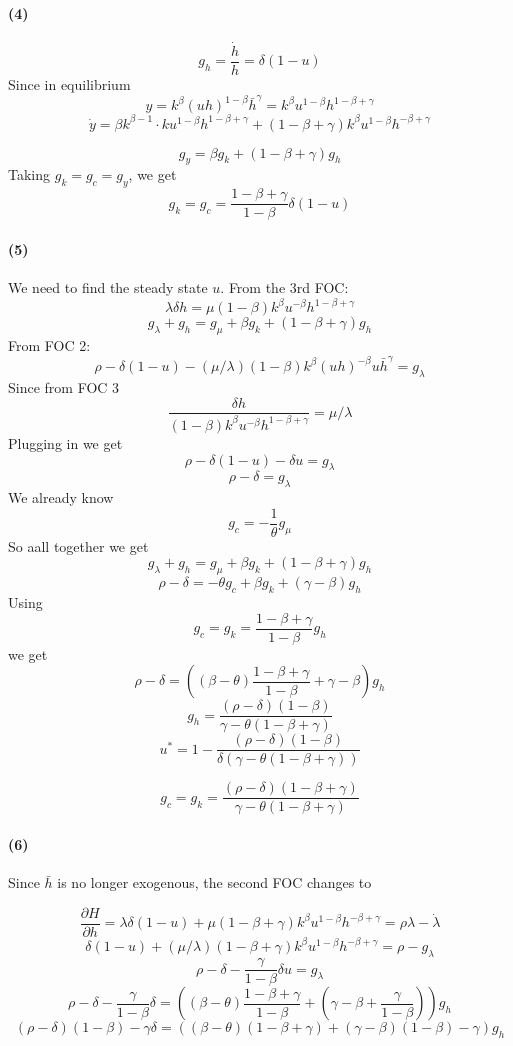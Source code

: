 \documentclass[10pt,letter]{article}
\newcommand{\problempart}[1]{\paragraph{#1}}
\begin{document}
\problempart{(4)}
\[ g_h = \frac{\dot{h}}{h} = \delta (1-u) \]
Since in equilibrium
\[ y = k^\beta (uh)^{1-\beta}\bar{h}^\gamma = k^\beta u^{1-\beta}h^{1-\beta + \gamma}\]
\[ \dot{y} = \beta k^{\beta - 1}\cdot{k} u^{1-\beta}h^{1-\beta + \gamma} + (1-\beta + \gamma )k^\beta u^{1-\beta}h^{-\beta + \gamma} \]

\[ g_y = \beta g_k  + (1-\beta + \gamma )g_h \]
Taking $g_k = g_c = g_y$, we get
\[ g_k = g_c = \frac{1-\beta + \gamma}{1-\beta}\delta (1-u) \]
\problempart{(5)}
We need to find the steady state $u$. From the 3rd FOC:
\[ \lambda \delta h = \mu (1-\beta)k^\beta u^{-\beta}h^{1 - \beta + \gamma}  \]
\[ g_\lambda + g_h = g_\mu + \beta g_k + (1-\beta+\gamma) g_h  \]
From FOC 2:
\[  \rho - \delta (1-u) - (\mu/\lambda) (1-\beta) k^\beta (uh)^{-\beta}u\bar{h}^\gamma = g_\lambda \]
Since from FOC 3
\[ \frac{\delta h}{(1-\beta)k^\beta u^{-\beta}h^{1 - \beta + \gamma}} = \mu/\lambda   \]
Plugging in we get
\[  \rho - \delta (1-u) - \delta u = g_\lambda \]
\[  \rho - \delta  = g_\lambda \]
We already know
\[ g_c = -\frac{1}{\theta} g_\mu \]
So aall together we get
\[ g_\lambda + g_h = g_\mu + \beta g_k + (1-\beta+\gamma) g_h  \]
\[ \rho - \delta   = - \theta g_c + \beta g_k + (\gamma - \beta) g_h  \]
Using
\[ g_c = g_k = \frac{1-\beta + \gamma}{1-\beta} g_h \]
we get
\[ \rho - \delta   =  \left( (\beta - \theta)\frac{1-\beta + \gamma}{1-\beta} + \gamma - \beta \right)  g_h  \]
\[ g_h  =  \frac{(\rho - \delta )(1-\beta)}{ \gamma - \theta(1-\beta + \gamma) }    \]
\[ u^* = 1 - \frac{(\rho - \delta )(1-\beta)}{ \delta (\gamma - \theta(1-\beta + \gamma) )}  \]

\[ g_c = g_k  =  \frac{(\rho - \delta )(1-\beta+\gamma)}{ \gamma - \theta(1-\beta + \gamma) }    \]

\problempart{(6)}
Since $\bar{h}$ is no longer exogenous, the second FOC changes to

\[ \frac{\partial H}{\partial h} = \lambda \delta (1-u) + \mu (1-\beta + \gamma) k^\beta u^{1-\beta}h^{-\beta+\gamma} = \rho \lambda - \dot{\lambda} \]
\[ \delta (1-u) + (\mu/\lambda) (1-\beta + \gamma) k^\beta u^{1-\beta}h^{-\beta+\gamma} = \rho  - g_\lambda \]
\[ \rho - \delta  -
\frac{ \gamma}{1-\beta} \delta u   = g_\lambda \]
\[ \rho - \delta -
\frac{ \gamma}{1-\beta} \delta  = \left((\beta- \theta) \frac{1-\beta + \gamma}{1-\beta} + \left(\gamma - \beta + \frac{\gamma}{1-\beta}\right) \right) g_h  \]
\[ (\rho - \delta)(1-\beta) -
\gamma \delta  = \left((\beta- \theta) (1-\beta + \gamma) + (\gamma - \beta)(1-\beta)  - \gamma  \right) g_h  \]
\end{document}

